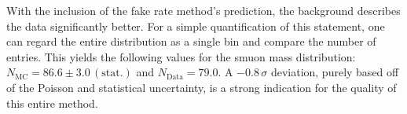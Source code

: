 With the inclusion of the fake rate method's prediction, the background describes the data significantly better. For a simple quantification of this statement, one can regard the entire distribution as a single bin and compare the number of entries. This yields the following values for the smuon mass distribution: $N_{\text{MC}} = 86.6 \pm 3.0\,(\text{stat.})$ and $N_{\text{Data}} = 79.0$. A $-0.8\,\sigma$ deviation, purely based off of the Poisson and statistical uncertainty, is a strong indication for the quality of this entire method.


